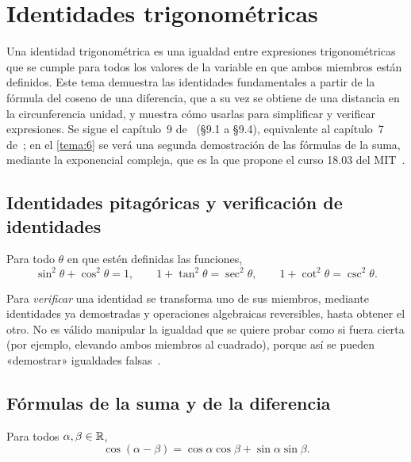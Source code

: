 \chapter{Identidades trigonométricas}
\label{tema:2}

Una identidad trigonométrica es una igualdad entre expresiones trigonométricas que se cumple para todos los valores de la variable en que ambos miembros están definidos. Este tema demuestra las identidades fundamentales a partir de la fórmula del coseno de una diferencia, que a su vez se obtiene de una distancia en la circunferencia unidad, y muestra cómo usarlas para simplificar y verificar expresiones. Se sigue el capítulo~9 de~\cite{osat} (§9.1 a §9.4), equivalente al capítulo~7 de~\cite{osprecalc}; en el \cref{tema:6} se verá una segunda demostración de las fórmulas de la suma, mediante la exponencial compleja, que es la que propone el curso 18.03 del MIT~\cite[§6.4]{mit1803}.

\section{Identidades pitagóricas y verificación de identidades}

\begin{proposicion}\label{prop:pitagoricas}
Para todo $\theta$ en que estén definidas las funciones,
\[
\sin^{2}\theta+\cos^{2}\theta=1,\qquad 1+\tan^{2}\theta=\sec^{2}\theta,\qquad 1+\cot^{2}\theta=\csc^{2}\theta.
\]
\end{proposicion}

Para \emph{verificar} una identidad se transforma uno de sus miembros, mediante identidades ya demostradas y operaciones algebraicas reversibles, hasta obtener el otro. No es válido manipular la igualdad que se quiere probar como si fuera cierta (por ejemplo, elevando ambos miembros al cuadrado), porque así se pueden «demostrar» igualdades falsas~\cite[§9.1]{osat}.

\addtocounter{definicion}{1}%

\section{Fórmulas de la suma y de la diferencia}

\begin{teorema}\label{teo:cos-diferencia}
Para todos $\alpha,\beta\in\mathbb{R}$,
\[
\cos(\alpha-\beta)=\cos\alpha\cos\beta+\sin\alpha\sin\beta .
\]
\end{teorema}

